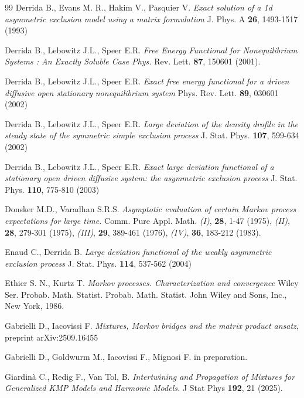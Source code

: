 \documentclass[reqno]{amsart}
\theoremstyle{plain}
\theoremstyle{definition}
\theoremstyle{remark}
\numberwithin{equation}{section}
\numberwithin{theorem}{section}
\newcommand{\<}{\langle}
\renewcommand{\>}{\rangle}
\begin{document}
\begin{thebibliography}{99}
		 Derrida B., Evans M. R., Hakim V., Pasquier V. {\it Exact solution of a 1d asymmetric exclusion model using a matrix formulation} J. Phys. A {\bf 26}, 1493-1517 (1993)
		
		 Derrida B., Lebowitz J.L., Speer E.R. {\it Free Energy Functional for Nonequilibrium Systems : An Exactly Soluble Case Phys.} Rev. Lett. {\bf 87}, 150601 (2001).
		
		 Derrida B., Lebowitz J.L., Speer E.R. {\it Exact free energy functional for a driven diffusive open stationary nonequilibrium system} Phys. Rev. Lett. {\bf 89}, 030601 (2002) 
		
		 Derrida B., Lebowitz J.L., Speer E.R. {\it Large deviation of the density drofile in the steady state of the symmetric simple exclusion process} J. Stat. Phys. {\bf 107}, 599-634 (2002)
		
		 Derrida B., Lebowitz  J.L., Speer E.R. {\it Exact large deviation functional of a stationary open driven diffusive system: the asymmetric exclusion process} J. Stat. Phys. {\bf 110}, 775-810 (2003) 
		
		 Donsker M.D., Varadhan  S.R.S. {\it Asymptotic
			evaluation of certain Markov process expectations for large time.}
		Comm. Pure Appl. Math.  {\it (I)}, \textbf{28}, 1-47 (1975),
		{\it (II)}, \textbf{28}, 279-301 (1975), {\it (III)}, \textbf{29},
		389-461 (1976), {\it (IV)}, \textbf{36}, 183-212 (1983).
		
		 Enaud C., Derrida B. {\it Large deviation functional of the weakly asymmetric exclusion process} J. Stat. Phys. {\bf 114}, 537-562 (2004)
		
		 Ethier S. N., Kurtz T.
		{\it Markov processes.
			Characterization and convergence}
		Wiley Ser. Probab. Math. Statist. Probab. Math. Statist.
		John Wiley and Sons, Inc., New York, 1986. 
		
		 Gabrielli D., Iacovissi F. {\it Mixtures, Markov bridges and the matrix product ansatz}, preprint arXiv:2509.16455
		
		  Gabrielli D., Goldwurm M., Iacovissi F., Mignosi F. in preparation.
		
		
		 Giardinà C., Redig F., Van Tol, B. {\it Intertwining and Propagation of Mixtures for Generalized KMP Models and Harmonic Models.} J Stat Phys {\bf 192}, 21 (2025).
		

\end{thebibliography}
\end{document}
